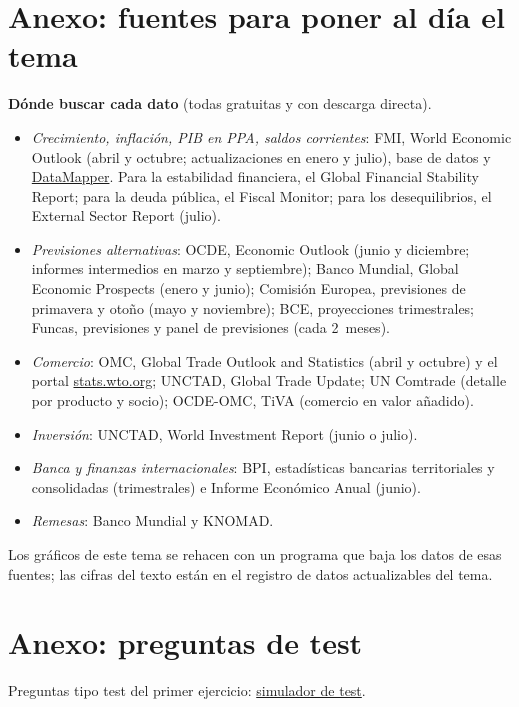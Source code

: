 \documentclass[11pt]{article}
\begin{document}
\clearpage
\appendix

\section{Anexo: fuentes para poner al día el tema}\label{anexo:fuentes}

\begin{anotaciones}
\textbf{Dónde buscar cada dato} (todas gratuitas y con descarga directa).
\begin{itemize}
\item \emph{Crecimiento, inflación, PIB en PPA, saldos corrientes}: FMI, World Economic Outlook (abril y octubre; actualizaciones en enero y julio), base de datos y \href{https://www.imf.org/external/datamapper}{DataMapper}. Para la estabilidad financiera, el Global Financial Stability Report; para la deuda pública, el Fiscal Monitor; para los desequilibrios, el External Sector Report (julio).
\item \emph{Previsiones alternativas}: OCDE, Economic Outlook (junio y diciembre; informes intermedios en marzo y septiembre); Banco Mundial, Global Economic Prospects (enero y junio); Comisión Europea, previsiones de primavera y otoño (mayo y noviembre); BCE, proyecciones trimestrales; Funcas, previsiones y panel de previsiones (cada 2~meses).
\item \emph{Comercio}: OMC, Global Trade Outlook and Statistics (abril y octubre) y el portal \href{https://stats.wto.org}{stats.wto.org}; UNCTAD, Global Trade Update; UN Comtrade (detalle por producto y socio); OCDE-OMC, TiVA (comercio en valor añadido).
\item \emph{Inversión}: UNCTAD, World Investment Report (junio o julio).
\item \emph{Banca y finanzas internacionales}: BPI, estadísticas bancarias territoriales y consolidadas (trimestrales) e Informe Económico Anual (junio).
\item \emph{Remesas}: Banco Mundial y KNOMAD.
\end{itemize}
Los gráficos de este tema se rehacen con un programa que baja los datos de esas fuentes; las cifras del texto están en el registro de datos actualizables del tema.
\end{anotaciones}

\section{Anexo: preguntas de test}\label{anexo:test}

\begin{anotaciones}
Preguntas tipo test del primer ejercicio: \href{https://www.victorgutierrezmarcos.es/oposicion/temario/primer-ejercicio/test/simulador.html?tema=3.B.32}{simulador de test}.
\end{anotaciones}

\bibliografia
\end{document}
